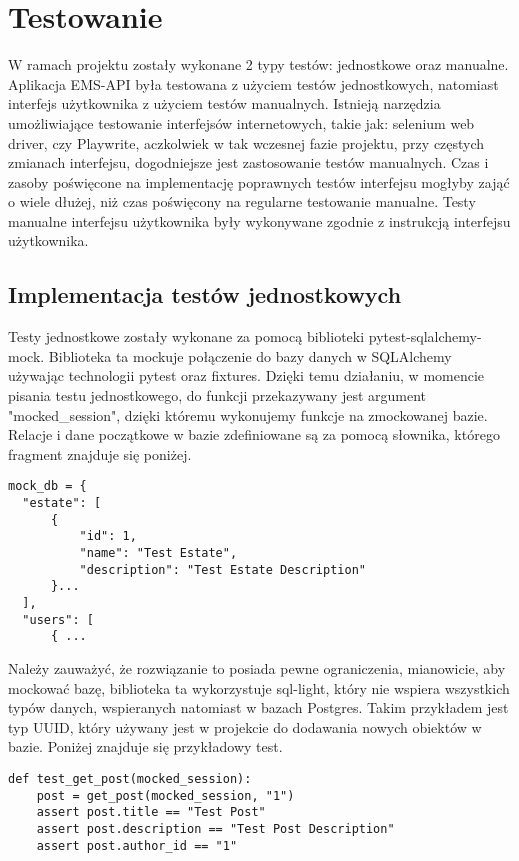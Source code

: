 \newpage
\section{Testowanie}
W ramach projektu zostały wykonane 2 typy testów: jednostkowe oraz manualne. Aplikacja EMS-API była testowana z użyciem testów jednostkowych, natomiast interfejs użytkownika z użyciem testów manualnych. Istnieją narzędzia umożliwiające testowanie interfejsów internetowych, takie jak: selenium web driver, czy Playwrite, aczkolwiek w tak wczesnej fazie projektu, przy częstych zmianach interfejsu, dogodniejsze jest zastosowanie testów manualnych. Czas i zasoby poświęcone na implementację poprawnych testów interfejsu mogłyby zająć o wiele dłużej, niż czas poświęcony na regularne testowanie manualne. Testy manualne interfejsu użytkownika były wykonywane zgodnie z instrukcją interfejsu użytkownika.
\subsection{Implementacja testów jednostkowych}
Testy jednostkowe zostały wykonane za pomocą biblioteki pytest-sqlalchemy-mock. Biblioteka ta mockuje połączenie do bazy danych w SQLAlchemy używając technologii pytest oraz fixtures. Dzięki temu działaniu, w momencie pisania testu jednostkowego, do funkcji przekazywany jest argument "mocked\_session", dzięki któremu wykonujemy funkcje na zmockowanej bazie. Relacje i dane początkowe w bazie zdefiniowane są za pomocą słownika, którego fragment znajduje się poniżej.
\begin{verbatim}
mock_db = {
  "estate": [
      {
          "id": 1,
          "name": "Test Estate",
          "description": "Test Estate Description"
      }...
  ],
  "users": [
      { ...
\end{verbatim}
Należy zauważyć, że rozwiązanie to posiada pewne ograniczenia, mianowicie, aby mockować bazę, biblioteka ta wykorzystuje sql-light, który nie wspiera wszystkich typów danych, wspieranych natomiast w bazach Postgres. Takim przykładem jest typ UUID, który używany jest w projekcie do dodawania nowych obiektów w bazie. Poniżej znajduje się przykładowy test.
\begin{verbatim}
def test_get_post(mocked_session):
    post = get_post(mocked_session, "1")
    assert post.title == "Test Post"
    assert post.description == "Test Post Description"
    assert post.author_id == "1"
\end{verbatim}
